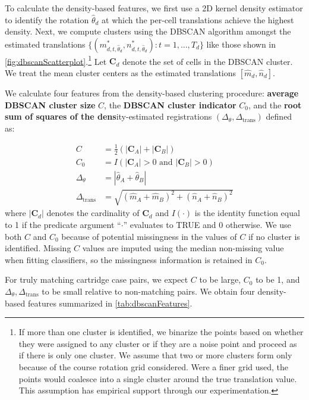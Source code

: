 \documentclass[preprint]{JASA}
\begin{document}
To calculate the density-based features, we first use a 2D kernel
density estimator \citep{MASS} to identify the rotation
\(\hat{\theta}_d\) at which the per-cell translations achieve the
highest density. Next, we compute clusters using the DBSCAN algorithm
amongst the estimated translations
\(\{(m^*_{d,t,\hat{\theta}_d},n^*_{d,t,\hat{\theta}_d}) : t = 1,...,T_d\}\)
like those shown in \autoref{fig:dbscanScatterplot}.\footnote{If more
  than one cluster is identified, we binarize the points based on
  whether they were assigned to any cluster or if they are a noise point
  and proceed as if there is only one cluster. We assume that two or
  more clusters form only because of the course rotation grid
  considered. Were a finer grid used, the points would coalesce into a
  single cluster around the true translation value. This assumption has
  empirical support through our experimentation.} Let \(\pmb{C}_d\)
denote the set of cells in the DBSCAN cluster. We treat the mean cluster
centers as the estimated translations \([\hat{m}_d,\hat{n}_d]\).

We calculate four features from the density-based clustering procedure:
\textbf{average DBSCAN cluster size} \(C\), the \textbf{DBSCAN cluster
indicator} \(C_0\), and the \textbf{root sum of squares of the
dens}ity-estimated registrations
\((\Delta_\theta, \Delta_{\text{trans}})\) defined as:

\begin{align*}
C &= \frac{1}{2}\left(|\pmb{C}_A| + |\pmb{C}_B|\right) \\
C_0 &= I(|\pmb{C}_A| > 0 \text{ and } |\pmb{C}_B| > 0)\\
\Delta_\theta &= |\hat{\theta}_A + \hat{\theta}_B| \\
\Delta_{\text{trans}} &= \sqrt{(\hat{m}_A + \hat{m}_B)^2 + (\hat{n}_A + \hat{n}_B)^2}
\end{align*} where \(|\pmb{C}_d|\) denotes the cardinality of
\(\pmb{C}_d\) and \(I(\cdot)\) is the identity function equal to 1 if
the predicate argument ``\(\cdot\)'' evaluates to TRUE and 0 otherwise.
We use both \(C\) and \(C_0\) because of potential missingness in the
values of \(C\) if no cluster is identified. Missing \(C\) values are
imputed using the median non-missing value when fitting classifiers, so
the missingness information is retained in \(C_0\).

For truly matching cartridge case pairs, we expect \(C\) to be large,
\(C_0\) to be 1, and \(\Delta_\theta, \Delta_{\text{trans}}\) to be
small relative to non-matching pairs. We obtain four density-based
features summarized in \autoref{tab:dbscanFeatures}.
\end{document}
